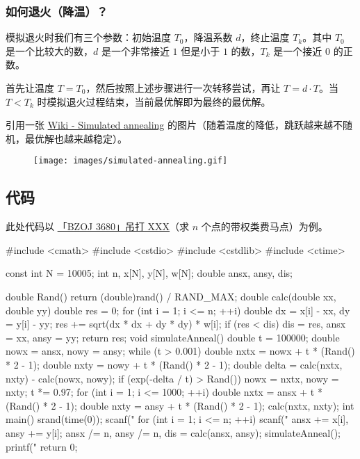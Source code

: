\subsubsection{如何退火（降温）？}

模拟退火时我们有三个参数：初始温度 $T_0$，降温系数 $d$，终止温度 $T_k$。其中 $T_0$ 是一个比较大的数，$d$ 是一个非常接近 $1$ 但是小于 $1$ 的数，$T_k$ 是一个接近 $0$ 的正数。

首先让温度 $T=T_0$，然后按照上述步骤进行一次转移尝试，再让 $T=d\cdot T$。当 $T<T_k$ 时模拟退火过程结束，当前最优解即为最终的最优解。

引用一张 \href{https://en.wikipedia.org/wiki/Simulated_annealing}{Wiki - Simulated annealing} 的图片（随着温度的降低，跳跃越来越不随机，最优解也越来越稳定）。

\begin{figure}[h]
\centering
\texttt{[image: images/simulated-annealing.gif]} 

\end{figure}

\hr

\subsection{代码}

此处代码以 \href{https://www.lydsy.com/JudgeOnline/problem.php?id=3680}{「BZOJ 3680」吊打 XXX}（求 $n$ 个点的带权类费马点）为例。

\begin{cppcode}
#include <cmath>
#include <cstdio>
#include <cstdlib>
#include <ctime>

const int N = 10005;
int n, x[N], y[N], w[N];
double ansx, ansy, dis;

double Rand() { return (double)rand() / RAND_MAX; }
double calc(double xx, double yy) {
  double res = 0;
  for (int i = 1; i <= n; ++i) {
    double dx = x[i] - xx, dy = y[i] - yy;
    res += sqrt(dx * dx + dy * dy) * w[i];
  }
  if (res < dis) dis = res, ansx = xx, ansy = yy;
  return res;
}
void simulateAnneal() {
  double t = 100000;
  double nowx = ansx, nowy = ansy;
  while (t > 0.001) {
    double nxtx = nowx + t * (Rand() * 2 - 1);
    double nxty = nowy + t * (Rand() * 2 - 1);
    double delta = calc(nxtx, nxty) - calc(nowx, nowy);
    if (exp(-delta / t) > Rand()) nowx = nxtx, nowy = nxty;
    t *= 0.97;
  }
  for (int i = 1; i <= 1000; ++i) {
    double nxtx = ansx + t * (Rand() * 2 - 1);
    double nxty = ansy + t * (Rand() * 2 - 1);
    calc(nxtx, nxty);
  }
}
int main() {
  srand(time(0));
  scanf("%
  for (int i = 1; i <= n; ++i) {
    scanf("%
    ansx += x[i], ansy += y[i];
  }
  ansx /= n, ansy /= n, dis = calc(ansx, ansy);
  simulateAnneal();
  printf("%
  return 0;
}
\end{cppcode}

